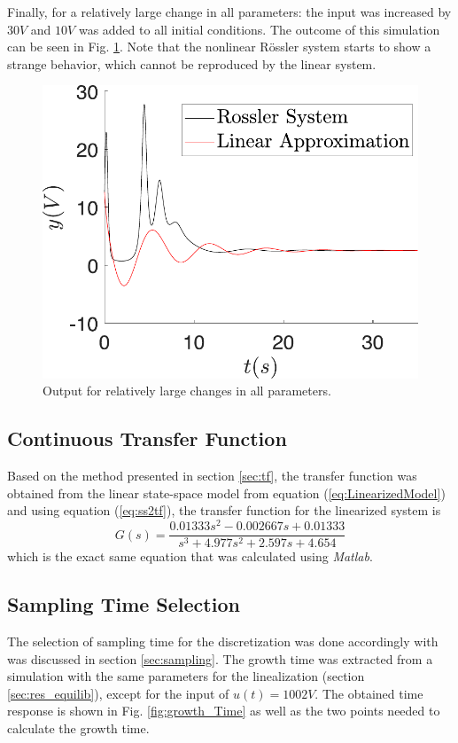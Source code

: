 Finally, for a relatively large change in all parameters: the input was increased by $30V$ and $10V$ was added to all initial conditions. The outcome of this simulation can be seen in Fig. \ref{fig:Delta_all_large}. Note that the nonlinear Rössler system starts to show a strange behavior, which cannot be reproduced by the linear system.
\begin{figure}[ht]
    \centering
    \includegraphics[scale=0.5]{figs/comparLinearVSNonlinear/Lejos_todos_lineal_nl_u30_ci10.pdf}
    \caption{Output for relatively large changes in all parameters.}
    \label{fig:Delta_all_large}
\end{figure}

\subsection{Continuous Transfer Function}\label{sec:result_tf}
 Based on the method presented in section \ref{sec:tf}, the transfer function was obtained from the linear state-space model from equation (\ref{eq:LinearizedModel}) and using equation (\ref{eq:ss2tf}), the transfer function for the linearized system is
 \begin{equation}\label{eq:tfNuestra}
     G(s)=\dfrac{0.01333s^2-0.002667s+0.01333}{s^3+4.977s^2+2.597s+4.654}
 \end{equation}
 which is the exact same equation that was calculated using \textit{Matlab}.
 
 \subsection{Sampling Time Selection}
  The selection of sampling time for the discretization was done accordingly with was discussed in section \ref{sec:sampling}. The growth time was extracted from a simulation with the same parameters for the linealization (section \ref{sec:res_equilib}), except for the input of $u(t)=1002V$. The obtained time response is shown in Fig. \ref{fig:growth_Time} as well as the two points needed to calculate the growth time.
  
